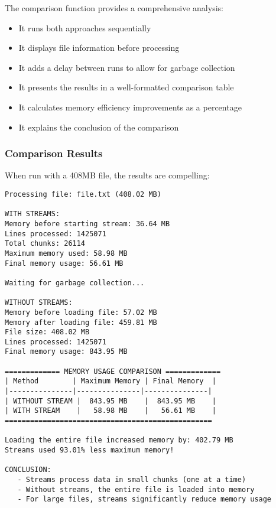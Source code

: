 \documentclass[12pt,letterpaper]{article}
\newenvironment{macterminal}{%
    \begin{mdframed}[
        linecolor=terminalFrame,
        backgroundcolor=terminalBg,
        roundcorner=5pt,
        skipabove=5pt,
        skipbelow=5pt,
        linewidth=1pt,
        innertopmargin=5pt,
        frametitle={%
            \tikz[baseline=(current bounding box.east), outer sep=0pt]{
                \fill[red!80!black] (0,0) circle (5pt);
                \fill[yellow!80!black] (0.7,0) circle (5pt);
                \fill[green!70!black] (1.4,0) circle (5pt);
            }
        },
        frametitlealignment=\raggedright,
        frametitleaboveskip=8pt,
        frametitlebelowskip=0pt,
    ]
}{%
    \end{mdframed}%
}
\begin{document}
The comparison function provides a comprehensive analysis:
\begin{itemize}
    \item It runs both approaches sequentially
    \item It displays file information before processing
    \item It adds a delay between runs to allow for garbage collection
    \item It presents the results in a well-formatted comparison table
    \item It calculates memory efficiency improvements as a percentage
    \item It explains the conclusion of the comparison
\end{itemize}

\subsubsection{Comparison Results}

When run with a 408MB file, the results are compelling:

\begin{macterminal}
\begin{lstlisting}
Processing file: file.txt (408.02 MB)

WITH STREAMS:
Memory before starting stream: 36.64 MB
Lines processed: 1425071
Total chunks: 26114
Maximum memory used: 58.98 MB
Final memory usage: 56.61 MB

Waiting for garbage collection...

WITHOUT STREAMS:
Memory before loading file: 57.02 MB
Memory after loading file: 459.81 MB
File size: 408.02 MB
Lines processed: 1425071
Final memory usage: 843.95 MB

============= MEMORY USAGE COMPARISON =============
| Method        | Maximum Memory | Final Memory  |
|---------------|---------------|---------------|
| WITHOUT STREAM |  843.95 MB    |  843.95 MB    |
| WITH STREAM    |   58.98 MB    |   56.61 MB    |
=================================================

Loading the entire file increased memory by: 402.79 MB
Streams used 93.01% less maximum memory!

CONCLUSION:
   - Streams process data in small chunks (one at a time)
   - Without streams, the entire file is loaded into memory
   - For large files, streams significantly reduce memory usage
\end{lstlisting}
\end{macterminal}
\end{document}
